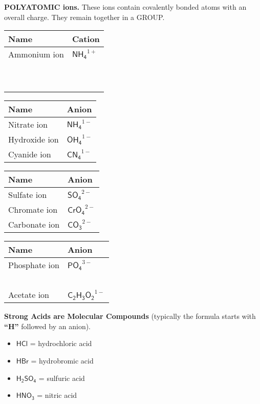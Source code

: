 \documentclass{article}
\theoremstyle{mytheoremstyle}
\theoremstyle{mytheoremstyle}
\theoremstyle{myproblemstyle}
\begin{document}
\textbf{POLYATOMIC ions.} These ions contain covalently bonded atoms with an overall charge. They remain together in a GROUP.

\begin{tabular}{ll}
    \textbf{Name} & \textbf{Cation} \\
    \hline
    Ammonium ion & \(\mathsf {NH_4}^{1+}\) \\
    ~            &                   \\
    ~            &                   \\
\end{tabular}
\begin{tabular}{ll}
    \textbf{Name} & \textbf{Anion} \\
    \hline
    Nitrate ion   & \(\mathsf {NH_4}^{1-}\) \\
    Hydroxide ion & \(\mathsf {OH_4}^{1-}\) \\
    Cyanide ion   & \(\mathsf {CN_4}^{1-}\) \\
\end{tabular}

\begin{tabular}{ll}
    \textbf{Name} & \textbf{Anion} \\
    \hline
    Sulfate ion   & \(\mathsf {SO_4}^{2-}\)  \\
    Chromate ion  & \(\mathsf {CrO_4}^{2-}\) \\
    Carbonate ion & \(\mathsf {CO_3}^{2-}\)  \\
\end{tabular}
\begin{tabular}{ll}
    \textbf{Name} & \textbf{Anion} \\
    \hline
    Phosphate ion & \(\mathsf {PO_4}^{3-}\)      \\
    ~             &                        \\
    Acetate ion   & \(\mathsf {C_2H_3O_2}^{1-}\) \\
\end{tabular}

\textbf{Strong Acids are Molecular Compounds} (typically the formula starts with \textbf{``H''} followed by an anion).

\begin{itemize}
    \item \(\mathsf{HCl}\) = hydrochloric acid
    \item \(\mathsf{HBr}\) = hydrobromic acid
    \item \(\mathsf{H_2SO_4}\) = sulfuric acid
    \item \(\mathsf{HNO_3}\) = nitric acid
\end{itemize}
\end{document}
